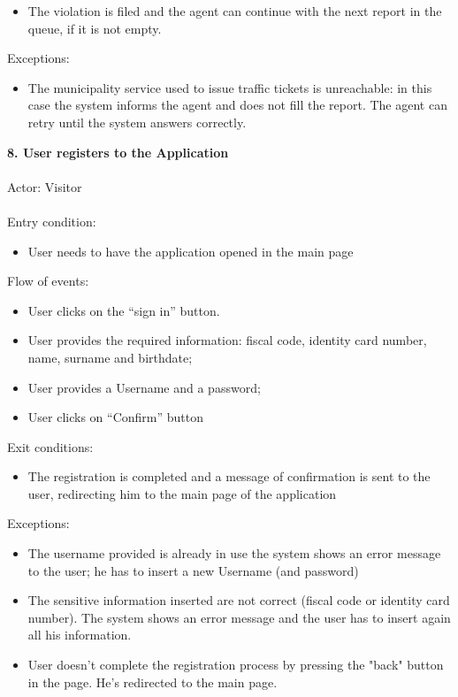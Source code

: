 \documentclass[a4paper]{report}
\begin{document}
\begin{itemize}
\item The violation is filed and the agent can continue with the next report in the queue, if it is not empty.
\end{itemize}
Exceptions: 
\begin{itemize}
\item The municipality service used to issue traffic tickets is unreachable: in this case the system informs the agent and does not fill the report. The agent can retry until the system answers correctly.
\end{itemize}
\textbf{8. User registers to the Application}\label{uc:8}
\\ \\
Actor: Visitor \\ \\
Entry condition: 
\begin{itemize}
\item User needs to have the application opened in the main page
\end{itemize}
Flow of events:
\begin{itemize}
\item User clicks on the “sign in” button.
\item User provides the required information: fiscal code, identity card number, name, surname and birthdate;
\item User provides a Username and a password;
\item User clicks on “Confirm” button
\end{itemize}
Exit conditions: 
\begin{itemize}
\item The registration is completed and a message of confirmation is sent to the user, redirecting him to the main page of the application
\end{itemize} 
Exceptions: 
\begin{itemize}
\item The username provided is already in use the system shows an error message to the user; he has to insert a new Username (and password)
\item The sensitive information inserted are not correct (fiscal code or identity card number). The system shows an error message and the user has to insert again all his information.
\item User doesn't complete the registration process by pressing the "back" button in the page. He's redirected to the main page.
\end{itemize}
\end{document}
